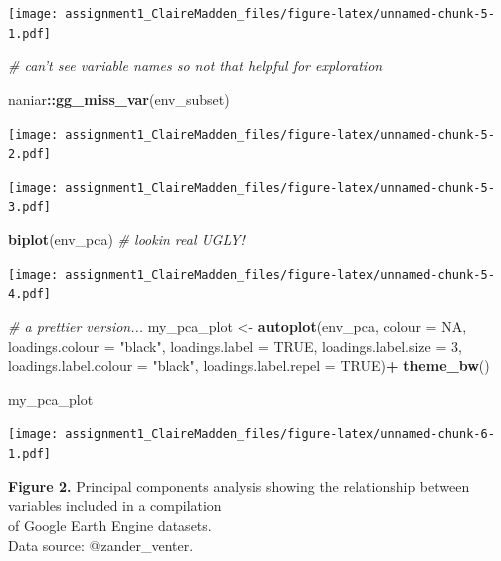 \documentclass[]{article}
\newenvironment{Shaded}{\begin{snugshade}}{\end{snugshade}}
\newcommand{\KeywordTok}[1]{\textcolor[rgb]{0.13,0.29,0.53}{\textbf{#1}}}
\newcommand{\DataTypeTok}[1]{\textcolor[rgb]{0.13,0.29,0.53}{#1}}
\newcommand{\DecValTok}[1]{\textcolor[rgb]{0.00,0.00,0.81}{#1}}
\newcommand{\StringTok}[1]{\textcolor[rgb]{0.31,0.60,0.02}{#1}}
\newcommand{\CommentTok}[1]{\textcolor[rgb]{0.56,0.35,0.01}{\textit{#1}}}
\newcommand{\OtherTok}[1]{\textcolor[rgb]{0.56,0.35,0.01}{#1}}
\newcommand{\OperatorTok}[1]{\textcolor[rgb]{0.81,0.36,0.00}{\textbf{#1}}}
\newcommand{\NormalTok}[1]{#1}
\begin{document}
\texttt{[image: assignment1\_ClaireMadden\_files/figure-latex/unnamed-chunk-5-1.pdf]}

\begin{Shaded}
\begin{Highlighting}[]
\CommentTok{# can't see variable names so not that helpful for exploration}

\NormalTok{naniar}\OperatorTok{::}\KeywordTok{gg_miss_var}\NormalTok{(env_subset)}
\end{Highlighting}
\end{Shaded}

\texttt{[image: assignment1\_ClaireMadden\_files/figure-latex/unnamed-chunk-5-2.pdf]}

\begin{Shaded}
\end{Shaded}

\texttt{[image: assignment1\_ClaireMadden\_files/figure-latex/unnamed-chunk-5-3.pdf]}

\begin{Shaded}
\begin{Highlighting}[]
\KeywordTok{biplot}\NormalTok{(env_pca) }\CommentTok{# lookin real UGLY! }
\end{Highlighting}
\end{Shaded}

\texttt{[image: assignment1\_ClaireMadden\_files/figure-latex/unnamed-chunk-5-4.pdf]}

\begin{Shaded}
\begin{Highlighting}[]
\CommentTok{# a prettier version...}
\NormalTok{my_pca_plot <-}\StringTok{ }\KeywordTok{autoplot}\NormalTok{(env_pca,}
                        \DataTypeTok{colour =} \OtherTok{NA}\NormalTok{,}
                        \DataTypeTok{loadings.colour =} \StringTok{"black"}\NormalTok{,}
                        \DataTypeTok{loadings.label =} \OtherTok{TRUE}\NormalTok{,}
                        \DataTypeTok{loadings.label.size =} \DecValTok{3}\NormalTok{,}
                        \DataTypeTok{loadings.label.colour =} \StringTok{"black"}\NormalTok{,}
                        \DataTypeTok{loadings.label.repel =} \OtherTok{TRUE}\NormalTok{)}\OperatorTok{+}
\StringTok{  }\KeywordTok{theme_bw}\NormalTok{()}

\NormalTok{my_pca_plot}
\end{Highlighting}
\end{Shaded}

\texttt{[image: assignment1\_ClaireMadden\_files/figure-latex/unnamed-chunk-6-1.pdf]}

\textbf{Figure 2.} Principal components analysis showing the
relationship between variables included in a compilation\\
of Google Earth Engine datasets.\\
Data source: @zander\_venter.
\end{document}
